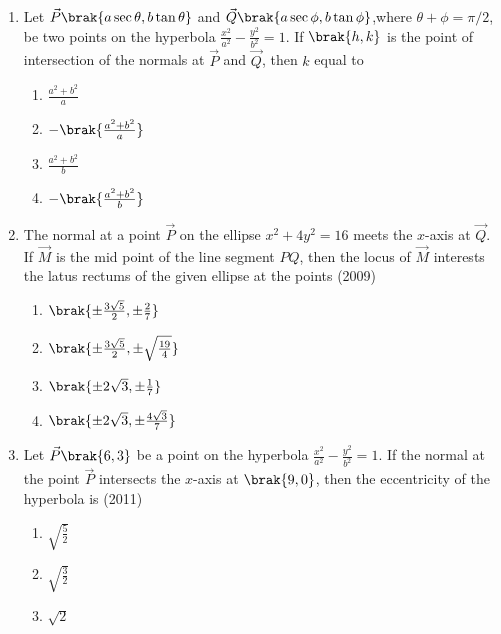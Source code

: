 \begin{enumerate}
\begin{multicols}{4}
\begin{enumerate}
	\item $2$
	\item infinite
	\end{enumerate}
\end{multicols}
\item Let $\vec{P}\brak{a\sec\theta,b\tan\theta}$ and $\vec{Q}\brak{a\sec\phi,b\tan \phi}$,where $\theta+\phi=\pi/2$, be two points on the hyperbola $\frac{x^2}{a^2}-\frac{y^2}{b^2}=1$. If $\brak{h,k}$ is the point of intersection of the normals at $\vec{P}$ and $\vec{Q}$, then $k$ equal to 
      \hfill {}
\begin{multicols}{4}
\begin{enumerate}
    \item $\frac{a^2+b^2}{a}$
    \item $-\brak{\frac{a^2+b^2}{a}}$
    \item $\frac{a^2+b^2}{b}$
    \item $-\brak{\frac{a^2+b^2}{b}}$
\end{enumerate}
\end{multicols}
    \item The normal at a point $\vec{P}$ on the ellipse $x^2 +4y^2=16$ meets the $x$-axis at $\vec{Q}$. If $\vec{M}$ is the mid point of the line segment ${PQ}$, then the locus of $\vec{M}$ interests the latus rectums of the given ellipse at the points
	\hfill (2009)
		\begin{multicols}{4}
\begin{enumerate}
			\item $\brak{\pm\frac{3\sqrt{5}}{2},\pm\frac{2}{7}}$
			\item $\brak{\pm\frac{3\sqrt{5}}{2},\pm\sqrt{\frac{19}{4}}}$
				\columnbreak
			\item $\brak{\pm2\sqrt{3},\pm\frac{1}{7}}$
			\item $\brak{\pm2\sqrt{3},\pm\frac{4\sqrt{3}}{7}}$
		\end{enumerate}
\end{multicols}
%
\item Let $\vec{P}\brak{6,3}$ be a point on the hyperbola $\frac{x^2}{a^2}-\frac{y^2}{b^2}=1$. If the normal at the point $\vec{P}$ intersects the $x$-axis at $\brak{9,0}$, then the eccentricity of the hyperbola is 
	\hfill (2011)
		\begin{multicols}{4}
\begin{enumerate}
			\item$\sqrt{\frac{5}{2}}$
			\item$\sqrt{\frac{3}{2}}$
				\columnbreak
			\item$\sqrt{2}$

\end{enumerate}
\end{multicols}
\end{enumerate}
